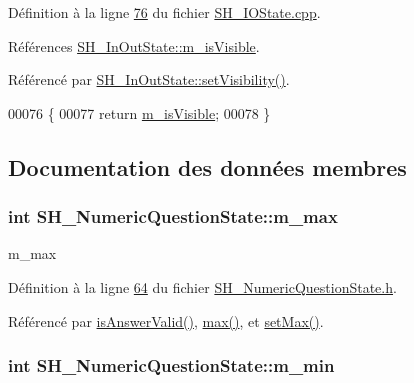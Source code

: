 Définition à la ligne \hyperlink{SH__IOState_8cpp_source_l00076}{76} du fichier \hyperlink{SH__IOState_8cpp_source}{S\-H\-\_\-\-I\-O\-State.\-cpp}.



Références \hyperlink{classSH__InOutState_a8fd66b185c9a55f0e84daa97e2acf53a}{S\-H\-\_\-\-In\-Out\-State\-::m\-\_\-is\-Visible}.



Référencé par \hyperlink{classSH__InOutState_a7fdfaa6f600f0ac4a96f238a038ba9ad}{S\-H\-\_\-\-In\-Out\-State\-::set\-Visibility()}.


\begin{DoxyCode}
00076                                \{
00077     \textcolor{keywordflow}{return} \hyperlink{classSH__InOutState_a8fd66b185c9a55f0e84daa97e2acf53a}{m\_isVisible};
00078 \}
\end{DoxyCode}


\subsection{Documentation des données membres}
\hypertarget{classSH__NumericQuestionState_a7c30cee8a2ff7807e9c9af7916a0ec24}{
\subsubsection[{m\-\_\-max}]{\setlength{\rightskip}{0pt plus 5cm}int S\-H\-\_\-\-Numeric\-Question\-State\-::m\-\_\-max\hspace{0.3cm}{\ttfamily [private]}}}\label{classSH__NumericQuestionState_a7c30cee8a2ff7807e9c9af7916a0ec24}


m\-\_\-max 



Définition à la ligne \hyperlink{SH__NumericQuestionState_8h_source_l00064}{64} du fichier \hyperlink{SH__NumericQuestionState_8h_source}{S\-H\-\_\-\-Numeric\-Question\-State.\-h}.



Référencé par \hyperlink{classSH__NumericQuestionState_a3676dec63a4da7cecf3fc28d8a197843}{is\-Answer\-Valid()}, \hyperlink{classSH__NumericQuestionState_ad728f30d51b325d362968e0bbd50e4f2}{max()}, et \hyperlink{classSH__NumericQuestionState_a0d87ada43daef76cc5a005e277c8eea0}{set\-Max()}.

\hypertarget{classSH__NumericQuestionState_a4e5fe957a054249989acc1efbb79c6d8}{
\subsubsection[{m\-\_\-min}]{\setlength{\rightskip}{0pt plus 5cm}int S\-H\-\_\-\-Numeric\-Question\-State\-::m\-\_\-min\hspace{0.3cm}{\ttfamily [private]}}}\label{classSH__NumericQuestionState_a4e5fe957a054249989acc1efbb79c6d8}



